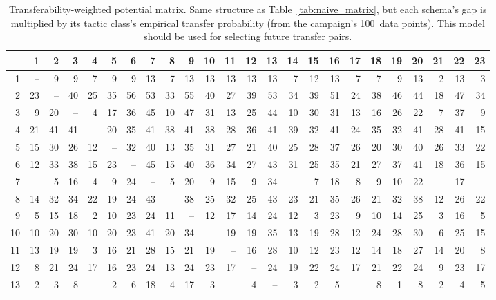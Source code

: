 \documentclass[11pt]{article}
\theoremstyle{definition}
\theoremstyle{remark}
\begin{document}
\begin{landscape}
\begin{table}[p]
\centering
\caption{Transferability-weighted potential matrix.  Same structure as
  Table~\ref{tab:naive_matrix}, but each schema's gap is multiplied by
  its tactic class's empirical transfer probability (from the campaign's
  100~data points).  This model should be used for selecting future
  transfer pairs.}
\label{tab:weighted_matrix}
\setlength{\tabcolsep}{2.5pt}
{\fontsize{5.5}{7}\selectfont
\begin{tabular}{@{}r|rrrrrrrrrrrrrrrrrrrrrrr@{}}
\toprule
& 1 & 2 & 3 & 4 & 5 & 6 & 7 & 8 & 9 & 10 & 11 & 12 & 13 & 14 & 15 & 16 & 17 & 18 & 19 & 20 & 21 & 22 & 23 \\
\midrule
1 & -- & 9 & 9 & 7 & 9 & 9 & 13 & 7 & 13 & 13 & 13 & 13 & 13 & 7 & 12 & 13 & 7 & 7 & 9 & 13 & 2 & 13 & 3 \\
2 & 23 & -- & 40 & 25 & 35 & 56 & 53 & 33 & 55 & 40 & 27 & 39 & 53 & 34 & 39 & 51 & 24 & 38 & 46 & 44 & 18 & 47 & 34 \\
3 & 9 & 20 & -- & 4 & 17 & 36 & 45 & 10 & 47 & 31 & 13 & 25 & 44 & 10 & 30 & 31 & 13 & 16 & 26 & 22 & 7 & 37 & 9 \\
4 & 21 & 41 & 41 & -- & 20 & 35 & 41 & 38 & 41 & 38 & 28 & 36 & 41 & 39 & 32 & 41 & 24 & 35 & 32 & 41 & 28 & 41 & 15 \\
5 & 15 & 30 & 26 & 12 & -- & 32 & 40 & 13 & 35 & 31 & 27 & 21 & 40 & 25 & 28 & 37 & 26 & 20 & 30 & 40 & 26 & 33 & 22 \\
6 & 12 & 33 & 38 & 15 & 23 & -- & 45 & 15 & 40 & 36 & 34 & 27 & 43 & 31 & 25 & 35 & 21 & 27 & 37 & 41 & 18 & 36 & 15 \\
7 & & 5 & 16 & 4 & 9 & 24 & -- & 5 & 20 & 9 & 15 & 9 & 34 & & 7 & 18 & 8 & 9 & 10 & 22 & & 17 & \\
8 & 14 & 32 & 34 & 22 & 19 & 24 & 43 & -- & 38 & 25 & 32 & 25 & 43 & 23 & 21 & 35 & 26 & 21 & 32 & 38 & 12 & 26 & 22 \\
9 & 5 & 15 & 18 & 2 & 10 & 23 & 24 & 11 & -- & 12 & 17 & 14 & 24 & 12 & 3 & 23 & 9 & 10 & 14 & 25 & 3 & 16 & 5 \\
10 & 10 & 20 & 30 & 10 & 20 & 23 & 41 & 20 & 34 & -- & 19 & 19 & 35 & 13 & 19 & 28 & 12 & 24 & 28 & 30 & 6 & 25 & 15 \\
11 & 13 & 19 & 19 & 3 & 16 & 21 & 28 & 15 & 21 & 19 & -- & 16 & 28 & 10 & 12 & 23 & 12 & 14 & 18 & 27 & 14 & 20 & 8 \\
12 & 8 & 21 & 24 & 17 & 16 & 23 & 24 & 13 & 24 & 23 & 17 & -- & 24 & 19 & 22 & 24 & 17 & 21 & 22 & 24 & 9 & 23 & 17 \\
13 & 2 & 3 & 8 & & 2 & 6 & 18 & 4 & 17 & 3 & & 4 & -- & 3 & 2 & 5 & & 8 & 1 & 8 & 2 & 4 & 5 \\

\end{tabular}}
\end{table}
\end{landscape}
\end{document}
